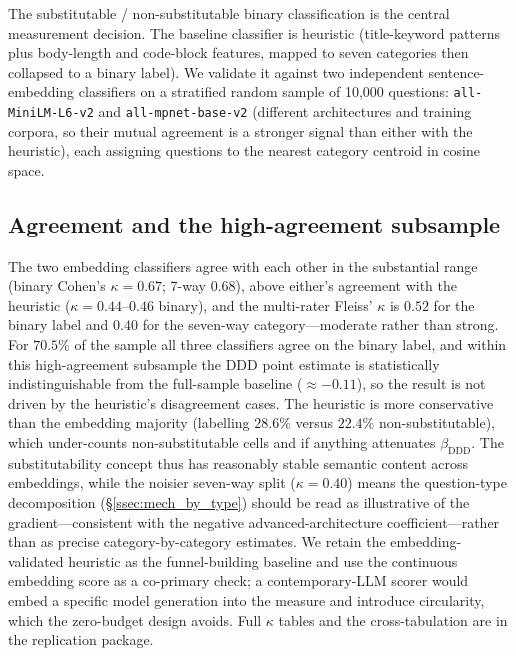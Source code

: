 \label{sec:validation_body}

The substitutable / non-substitutable binary classification is
the central measurement decision. The baseline classifier is
heuristic (title-keyword patterns plus body-length and
code-block features, mapped to seven categories then collapsed to
a binary label). We validate it against two independent
sentence-embedding classifiers on a stratified random sample of
10{,}000 questions: \texttt{all-MiniLM-L6-v2} and
\texttt{all-mpnet-base-v2} (different architectures and training
corpora, so their mutual agreement is a stronger signal than
either with the heuristic), each assigning questions to the
nearest category centroid in cosine space.

\subsection{Agreement and the high-agreement
subsample}\label{ssec:val_kappa}\label{ssec:val_high_agree}\label{ssec:val_protocol}\label{ssec:val_crosstab}\label{ssec:val_implications}

The two embedding classifiers agree with each other in the
substantial range (binary Cohen's $\kappa=0.67$; 7-way $0.68$),
above either's agreement with the heuristic ($\kappa=0.44$--$0.46$
binary), and the multi-rater Fleiss' $\kappa$ is $0.52$ for the
binary label and $0.40$ for the seven-way category---moderate
rather than strong. For $70.5\%$ of the sample all three
classifiers agree on the binary label, and within this
high-agreement subsample the DDD point estimate is statistically
indistinguishable from the full-sample baseline ($\approx-0.11$),
so the result is not driven by the heuristic's disagreement
cases. The heuristic is more conservative than the embedding
majority (labelling $28.6\%$ versus $22.4\%$ non-substitutable),
which under-counts non-substitutable cells and if anything
attenuates $\beta_{\text{DDD}}$. The substitutability concept
thus has reasonably stable semantic content across embeddings,
while the noisier seven-way split ($\kappa=0.40$) means the
question-type decomposition (\S\ref{ssec:mech_by_type}) should be
read as illustrative of the gradient---consistent with the
negative advanced-architecture coefficient---rather than as
precise category-by-category estimates. We retain the
embedding-validated heuristic as the funnel-building baseline and
use the continuous embedding score as a co-primary check; a
contemporary-LLM scorer would embed a specific model generation
into the measure and introduce circularity, which the zero-budget
design avoids. Full $\kappa$ tables and the cross-tabulation are
in the replication package.
